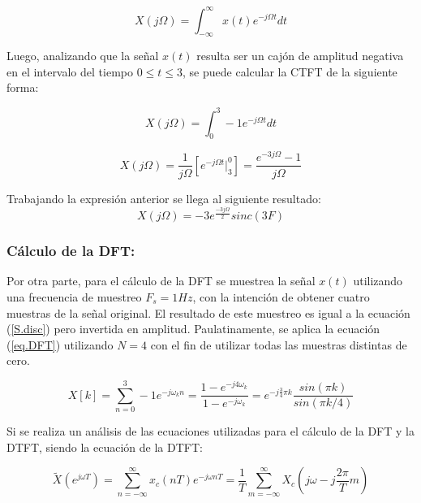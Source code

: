 \documentclass[11pt,a4paper]{article}
\begin{document}
\begin{equation}
    X(j\Omega)=\int_{-\infty}^{\infty} x(t)e^{-j\Omega t}dt
\end{equation}

Luego, analizando que la señal $x(t)$ resulta ser un cajón de amplitud negativa en el intervalo del tiempo $0\leq t \leq 3$, se puede calcular la CTFT de la siguiente forma:

\begin{equation}
    X(j\Omega)=\int_{0}^{3} -1e^{-j\Omega t}dt
\end{equation}	

\begin{equation}
    X(j\Omega)=\frac{1}{j\Omega} \left[e^{-j\Omega t} \vert_{3}^{0}\right] = \frac{e^{-3j\Omega} - 1}{j\Omega}
\end{equation}

Trabajando la expresión anterior se llega al siguiente resultado:
\begin{equation}
    X(j\Omega) = -3e^{\frac{-3j\Omega}{2}} sinc(3F)
\end{equation}

\subsubsection*{Cálculo de la DFT:}

Por otra parte, para el cálculo de la DFT se muestrea la señal $x(t)$ utilizando una frecuencia de muestreo $F_s=1Hz$, con la intención de obtener cuatro muestras de la señal original. El resultado de este muestreo es igual a la ecuación (\ref{S.disc}) pero invertida en amplitud. Paulatinamente, se aplica la ecuación (\ref{eq.DFT}) utilizando $N=4$ con el fin de utilizar todas las muestras distintas de cero.

\begin{equation}
    X[k]=\sum_{n=0}^{3}-1e^{-j\omega_k n} = \frac{1 - e^{-j4\omega_k}}{1-e^{-j\omega_k}} = e^{-j\frac{3}{4}\pi k} \frac{sin(\pi k)}{sin(\pi k/4)}
    \label{S.disc}
\end{equation} 

Si se realiza un análisis de las ecuaciones utilizadas para el cálculo de la DFT y la DTFT, siendo la ecuación de la DTFT:
 
\begin{equation}
    \label{DTFT}
	\tilde{X}(e^{j \omega T}) = \sum_{n=- \infty}^{\infty} x_{c}(nT) e^{-j \omega nT}=\frac{1}{T}\sum_{m=- \infty}^{\infty} X_{c} \left(j \omega - j \frac{2 \pi}{T}	m \right)	
\end{equation}
\end{document}
